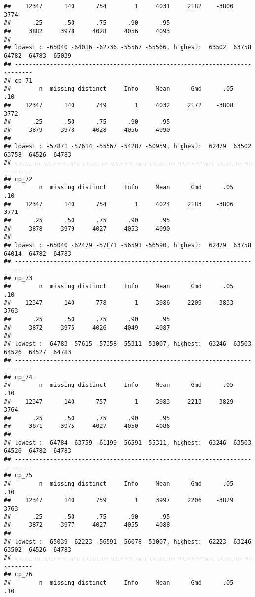 \documentclass[]{article}
\begin{document}
\begin{verbatim}
##    12347      140      754        1     4031     2182    -3800     3774 
##      .25      .50      .75      .90      .95 
##     3882     3978     4028     4056     4093 
## 
## lowest : -65040 -64016 -62736 -55567 -55566, highest:  63502  63758  64782  64783  65039
## ---------------------------------------------------------------------------
## cp_71 
##        n  missing distinct     Info     Mean      Gmd      .05      .10 
##    12347      140      749        1     4032     2172    -3808     3772 
##      .25      .50      .75      .90      .95 
##     3879     3978     4028     4056     4090 
## 
## lowest : -57871 -57614 -55567 -54287 -50959, highest:  62479  63502  63758  64526  64783
## ---------------------------------------------------------------------------
## cp_72 
##        n  missing distinct     Info     Mean      Gmd      .05      .10 
##    12347      140      754        1     4024     2183    -3806     3771 
##      .25      .50      .75      .90      .95 
##     3878     3979     4027     4053     4090 
## 
## lowest : -65040 -62479 -57871 -56591 -56590, highest:  62479  63758  64014  64782  64783
## ---------------------------------------------------------------------------
## cp_73 
##        n  missing distinct     Info     Mean      Gmd      .05      .10 
##    12347      140      778        1     3986     2209    -3833     3763 
##      .25      .50      .75      .90      .95 
##     3872     3975     4026     4049     4087 
## 
## lowest : -64783 -57615 -57358 -55311 -53007, highest:  63246  63503  64526  64527  64783
## ---------------------------------------------------------------------------
## cp_74 
##        n  missing distinct     Info     Mean      Gmd      .05      .10 
##    12347      140      757        1     3983     2213    -3829     3764 
##      .25      .50      .75      .90      .95 
##     3871     3975     4027     4050     4086 
## 
## lowest : -64784 -63759 -61199 -56591 -55311, highest:  63246  63503  64526  64782  64783
## ---------------------------------------------------------------------------
## cp_75 
##        n  missing distinct     Info     Mean      Gmd      .05      .10 
##    12347      140      759        1     3997     2206    -3829     3763 
##      .25      .50      .75      .90      .95 
##     3872     3977     4027     4055     4088 
## 
## lowest : -65039 -62223 -56591 -56078 -53007, highest:  62223  63246  63502  64526  64783
## ---------------------------------------------------------------------------
## cp_76 
##        n  missing distinct     Info     Mean      Gmd      .05      .10 

\end{verbatim}
\end{document}
